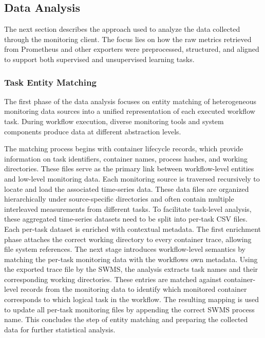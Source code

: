 \subsection{Data Analysis}
\label{sec:data_analysis}
The next section describes the approach used to analyze the data collected through the monitoring client. The focus lies on how the raw metrics retrieved from Prometheus and other exporters were preprocessed, structured, and aligned to support both supervised and unsupervised learning tasks.

\subsubsection{Task Entity Matching}
\label{sec:task_entity_matching}
The first phase of the data analysis focuses on entity matching of heterogeneous monitoring data sources into a unified representation of each executed workflow task. During workflow execution, diverse monitoring tools and system components produce data at different abstraction levels.

The matching process begins with container lifecycle records, which provide information on task identifiers, container names, process hashes, and working directories. These files serve as the primary link between workflow-level entities and low-level monitoring data. Each monitoring source is traversed recursively to locate and load the associated time-series data. These data files are organized hierarchically under source-specific directories and often contain multiple interleaved measurements from different tasks. To facilitate task-level analysis, these aggregated time-series datasets need to be split into per-task CSV files.
Each per-task dataset is enriched with contextual metadata. The first enrichment phase attaches the correct working directory to every container trace, allowing file system references.
The next stage introduces workflow-level semantics by matching the per-task monitoring data with the workflows own metadata. Using the exported trace file by the SWMS, the analysis extracts task names and their corresponding working directories. These entries are matched against container-level records from the monitoring data to identify which monitored container corresponds to which logical task in the workflow. The resulting mapping is used to update all per-task monitoring files by appending the correct SWMS process name. This concludes the step of entity matching and preparing the collected data for further statistical analysis.

